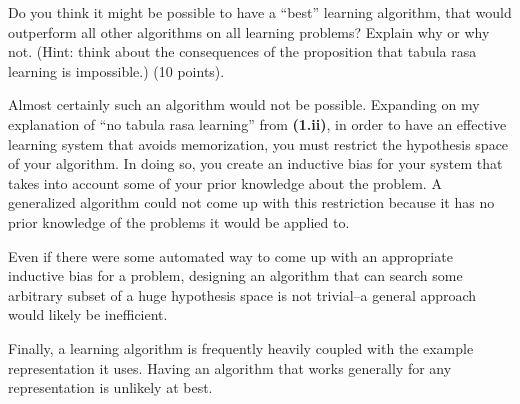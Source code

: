 \documentclass[fleqn]{homework}
\begin{document}
  \begin{problem}{2}
    \begin{question}
      Do you think it might be possible to have a ``best'' learning algorithm,
      that would outperform all other algorithms on all learning problems?
      Explain why or why not.  (Hint: think about the consequences of the
      proposition that tabula rasa learning is impossible.) (10 points).
    \end{question}

    Almost certainly such an algorithm would not be possible.  Expanding on my
    explanation of ``no tabula rasa learning'' from \textbf{(1.ii)}, in order to
    have an effective learning system that avoids memorization, you must
    restrict the hypothesis space of your algorithm.  In doing so, you create an
    inductive bias for your system that takes into account some of your prior
    knowledge about the problem.  A generalized algorithm could not come up with
    this restriction because it has no prior knowledge of the problems it would
    be applied to.

    Even if there were some automated way to come up with an appropriate
    inductive bias for a problem, designing an algorithm that can search some
    arbitrary subset of a huge hypothesis space is not trivial--a general
    approach would likely be inefficient.

    Finally, a learning algorithm is frequently heavily coupled with the example
    representation it uses.  Having an algorithm that works generally for any
    representation is unlikely at best.
  \end{problem}
\end{document}
